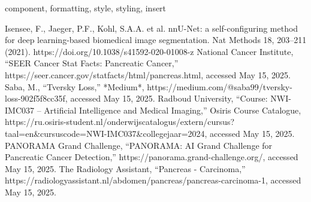 \documentclass[conference]{IEEEtran}
\begin{document}
\begin{IEEEkeywords}
component, formatting, style, styling, insert
\end{IEEEkeywords}

\begin{thebibliography}{00}
 Isensee, F., Jaeger, P.F., Kohl, S.A.A. et al. nnU-Net: a self-configuring method for deep learning-based biomedical image segmentation. Nat Methods 18, 203–211 (2021). https://doi.org/10.1038/s41592-020-01008-z
 National Cancer Institute, ``SEER Cancer Stat Facts: Pancreatic Cancer,'' https://seer.cancer.gov/statfacts/html/pancreas.html, accessed May 15, 2025.
 Saba, M., ``Tversky Loss,'' *Medium*, https://medium.com/@saba99/tversky-loss-902f5f8cc35f, accessed May 15, 2025.
 Radboud University, ``Course: NWI-IMC037 – Artificial Intelligence and Medical Imaging,'' Osiris Course Catalogue, https://ru.osiris-student.nl/onderwijscatalogus/extern/cursus?taal=en\&cursuscode=NWI-IMC037\&collegejaar=2024, accessed May 15, 2025.
 PANORAMA Grand Challenge, ``PANORAMA: AI Grand Challenge for Pancreatic Cancer Detection,'' https://panorama.grand-challenge.org/, accessed May 15, 2025.
 The Radiology Assistant, ``Pancreas - Carcinoma,'' https://radiologyassistant.nl/abdomen/pancreas/pancreas-carcinoma-1, accessed May 15, 2025.




\end{thebibliography}
\end{document}
